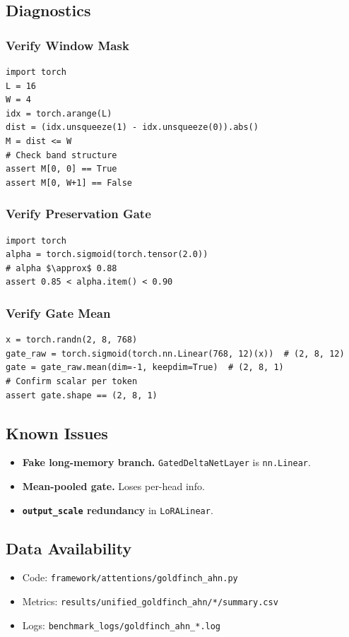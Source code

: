 \subsection{Diagnostics}

\subsubsection{Verify Window Mask}

\begin{lstlisting}
import torch
L = 16
W = 4
idx = torch.arange(L)
dist = (idx.unsqueeze(1) - idx.unsqueeze(0)).abs()
M = dist <= W
# Check band structure
assert M[0, 0] == True
assert M[0, W+1] == False
\end{lstlisting}

\subsubsection{Verify Preservation Gate}

\begin{lstlisting}
import torch
alpha = torch.sigmoid(torch.tensor(2.0))
# alpha $\approx$ 0.88
assert 0.85 < alpha.item() < 0.90
\end{lstlisting}

\subsubsection{Verify Gate Mean}

\begin{lstlisting}
x = torch.randn(2, 8, 768)
gate_raw = torch.sigmoid(torch.nn.Linear(768, 12)(x))  # (2, 8, 12)
gate = gate_raw.mean(dim=-1, keepdim=True)  # (2, 8, 1)
# Confirm scalar per token
assert gate.shape == (2, 8, 1)
\end{lstlisting}

\subsection{Known Issues}

\begin{itemize}
\item \textbf{Fake long-memory branch.} \texttt{GatedDeltaNetLayer} is \texttt{nn.Linear}.
\item \textbf{Mean-pooled gate.} Loses per-head info.
\item \textbf{\texttt{output\_scale} redundancy} in \texttt{LoRALinear}.

\end{itemize}
\subsection{Data Availability}

\begin{itemize}
\item Code: \texttt{framework/attentions/goldfinch\_ahn.py}
\item Metrics: \texttt{results/unified\_goldfinch\_ahn/*/summary.csv}
\item Logs: \texttt{benchmark\_logs/goldfinch\_ahn\_*.log}

\end{itemize}
